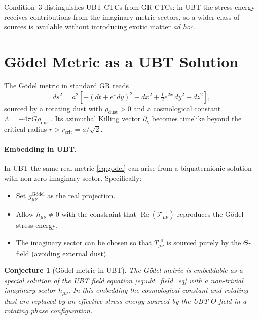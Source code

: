 \documentclass[12pt]{article}
\newtheorem{conjecture}{Conjecture}
\begin{document}
Condition~3 distinguishes UBT CTCs from GR CTCs: in UBT the stress-energy
receives contributions from the imaginary metric sectors, so a wider class
of sources is available without introducing exotic matter \emph{ad hoc}.

\section{Gödel Metric as a UBT Solution}
The Gödel metric in standard GR reads
\begin{equation}
  ds^2 = a^2\!\left[
    -\left(dt + e^x dy\right)^2 + dx^2
    + \tfrac{1}{2}e^{2x}\,dy^2 + dz^2
  \right],
  \label{eq:godel}
\end{equation}
sourced by a rotating dust with $\rho_{\mathrm{dust}} > 0$ and a cosmological
constant $\Lambda = -4\pi G\rho_{\mathrm{dust}}$.  Its azimuthal Killing
vector $\partial_y$ becomes timelike beyond the critical radius
$r > r_\mathrm{crit} = a/\sqrt{2}$.

\paragraph{Embedding in UBT.}
In UBT the same real metric \eqref{eq:godel} can arise from a biquaternionic
solution with non-zero imaginary sector.  Specifically:
\begin{itemize}
  \item Set $g_{\mu\nu}^{\mathrm{Gödel}}$ as the real projection.
  \item Allow $h_{\mu\nu} \neq 0$ with the constraint that
    $\operatorname{Re}(\mathcal{T}_{\mu\nu})$ reproduces the Gödel
    stress-energy.
  \item The imaginary sector can be chosen so that $T_{\mu\nu}^{\mathrm{eff}}$
    is sourced purely by the $\Theta$-field (avoiding external dust).
\end{itemize}

\begin{conjecture}[Gödel metric in UBT]
\label{conj:godel_ubt}
The Gödel metric is embeddable as a special solution of the UBT field
equation \eqref{eq:ubt_field_eq} with a non-trivial imaginary sector
$h_{\mu\nu}$.  In this embedding the cosmological constant and rotating
dust are replaced by an effective stress-energy sourced by the UBT
$\Theta$-field in a rotating phase configuration.
\end{conjecture}
\end{document}
